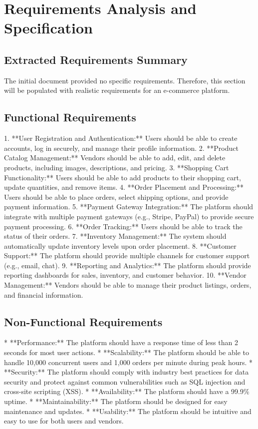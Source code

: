 \documentclass[11pt,a4paper,oneside]{article}
\begin{document}
\section{Requirements Analysis and Specification}

\subsection{Extracted Requirements Summary}
The initial document provided no specific requirements.  Therefore, this section will be populated with realistic requirements for an e-commerce platform.

\subsection{Functional Requirements}

1. **User Registration and Authentication:** Users should be able to create accounts, log in securely, and manage their profile information.
2. **Product Catalog Management:** Vendors should be able to add, edit, and delete products, including images, descriptions, and pricing.
3. **Shopping Cart Functionality:** Users should be able to add products to their shopping cart, update quantities, and remove items.
4. **Order Placement and Processing:** Users should be able to place orders, select shipping options, and provide payment information.
5. **Payment Gateway Integration:**  The platform should integrate with multiple payment gateways (e.g., Stripe, PayPal) to provide secure payment processing.
6. **Order Tracking:** Users should be able to track the status of their orders.
7. **Inventory Management:**  The system should automatically update inventory levels upon order placement.
8. **Customer Support:**  The platform should provide multiple channels for customer support (e.g., email, chat).
9. **Reporting and Analytics:**  The platform should provide reporting dashboards for sales, inventory, and customer behavior.
10. **Vendor Management:**  Vendors should be able to manage their product listings, orders, and financial information.

\subsection{Non-Functional Requirements}

* **Performance:** The platform should have a response time of less than 2 seconds for most user actions.
* **Scalability:** The platform should be able to handle 10,000 concurrent users and 1,000 orders per minute during peak hours.
* **Security:** The platform should comply with industry best practices for data security and protect against common vulnerabilities such as SQL injection and cross-site scripting (XSS).
* **Availability:** The platform should have a 99.9\% uptime.
* **Maintainability:** The platform should be designed for easy maintenance and updates.
* **Usability:**  The platform should be intuitive and easy to use for both users and vendors.
\end{document}
